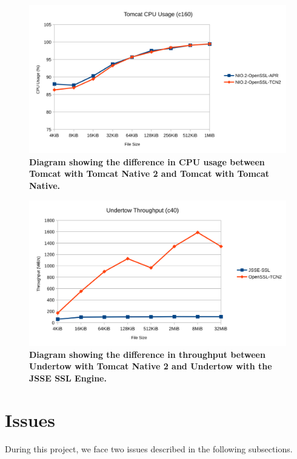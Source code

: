 \documentclass[11pt,a4paper,bibliography=totocnumbered]{scrartcl}
\def\mytitle{Tomcat Native 2}
\begin{document}
\begin{figure}[!h]
	\begin{center}
		\includegraphics[scale=0.22]{tomcat-cpu.pdf}
	\end{center}
	\caption{\textbf{Diagram showing the difference in CPU usage between Tomcat with \mytitle{} and Tomcat with Tomcat Native.}}
	\label{fig:tomcat-cpu}
\end{figure}

\begin{figure}[!h]
	\begin{center}
		\includegraphics[scale=0.23]{undertow-throughput.pdf}
	\end{center}
	\caption{\textbf{Diagram showing the difference in throughput between Undertow with \mytitle{} and Undertow with the JSSE SSL Engine.}}
	\label{fig:undertow-throughput}
\end{figure}

\FloatBarrier
\section{Issues}
\label{sec:issues}
During this project, we face two issues described in the following subsections.
\end{document}
